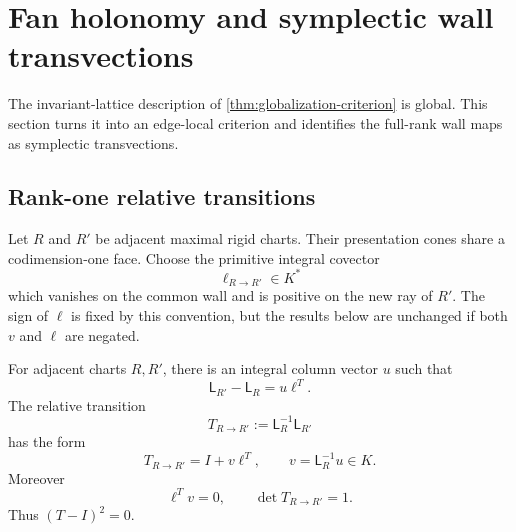 \section{Fan holonomy and symplectic wall transvections}
\label{sec:holonomy}

The invariant-lattice description of \cref{thm:globalization-criterion} is
global.  This section turns it into an edge-local criterion and identifies the
full-rank wall maps as symplectic transvections.

\subsection{Rank-one relative transitions}

Let $R$ and $R'$ be adjacent maximal rigid charts.  Their presentation cones
share a codimension-one face.  Choose the primitive integral covector
\[
 \ell_{R\to R'}\in K^*
\]
which vanishes on the common wall and is positive on the new ray of $R'$.
The sign of $\ell$ is fixed by this convention, but the results below are
unchanged if both $v$ and $\ell$ are negated.

\begin{proposition}
\label{prop:rank-one-wall}
For adjacent charts $R,R'$, there is an integral column vector $u$ such that
\begin{equation}
 \mathsf L_{R'}-\mathsf L_R=u\ell^T.
 \label{eq:rank-one-difference}
\end{equation}
The relative transition
\begin{equation}
 T_{R\to R'}:=\mathsf L_R^{-1}\mathsf L_{R'}
 \label{eq:relative-transition}
\end{equation}
has the form
\begin{equation}
 \boxed{T_{R\to R'}=I+v\ell^T,\qquad v=\mathsf L_R^{-1}u\in K.}
 \label{eq:rank-one-transition}
\end{equation}
Moreover
\begin{equation}
 \ell^Tv=0,
 \qquad
 \det T_{R\to R'}=1.
 \label{eq:unipotent-wall}
\end{equation}
Thus $(T-I)^2=0$.
\end{proposition}

